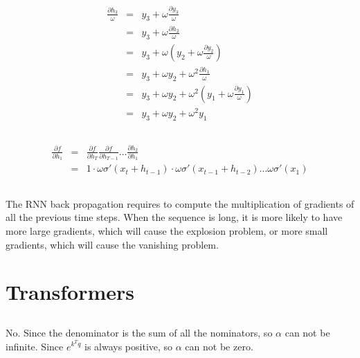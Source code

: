 \documentclass[12pt]{article}
\begin{document}
\subsection{}
\begin{eqnarray}
    \frac{\partial h_3}{\omega} &=& y_3 + \omega \frac{\partial y_3}{\omega} \nonumber \\
    &=& y_3 + \omega \frac{\partial h_2}{\omega} \nonumber \\
    &=& y_3 + \omega (y_2 + \omega \frac{\partial y_2}{\omega}) \nonumber \\
    &=& y_3 + \omega y_2 + \omega^2 \frac{\partial h_1}{\omega} \nonumber \\
    &=& y_3 + \omega y_2 + \omega^2 (y_1 + \omega \frac{\partial y_1}{\omega}) \nonumber \\
    &=& y_3 + \omega y_2 + \omega^2 y_1 \nonumber
\end{eqnarray}

\subsection{}
\begin{eqnarray}
    \frac{\partial f}{\partial h_1} &=& \frac{\partial f}{\partial h_T} \frac{\partial f}{\partial h_{T-1}} \dots \frac{\partial h_2}{\partial h_1} \nonumber \\
    &=& 1 \cdot \omega \sigma'(x_t + h_{t-1}) \cdot \omega \sigma'(x_{t-1} + h_{t-2}) \dots \omega \sigma'(x_1) \nonumber 
\end{eqnarray}

\subsection{}
The RNN back propagation requires to compute the multiplication of gradients of all the previous time steps. When the sequence is long, it is more likely to have more large gradients, which will cause the explosion problem, or more small gradients, which will cause the vanishing problem.

\section{Transformers}
\subsection{}
No. Since the denominator is the sum of all the nominators, so $\alpha$ can not be infinite. Since $e^{k^T q}$ is always positive, so $\alpha$ can not be zero. 
\end{document}
